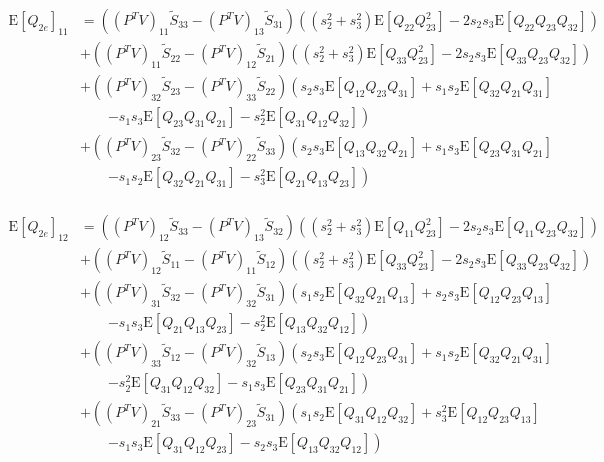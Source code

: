 \documentclass[10pt]{article}
\newcommand{\expect}[1]{\ensuremath{\mathrm{E}\left[ #1 \right]}}
\begin{document}
\begin{align}
	\expect{Q_{2e}}_{11} &= \left( (P^TV)_{11}\tilde{S}_{33} - (P^TV)_{13}\tilde{S}_{31} \right)\left( (s_2^2+s_3^2)\expect{Q_{22}Q_{23}^2} - 2s_2s_3 \expect{Q_{22}Q_{23}Q_{32}} \right) \nonumber \\
	&+ \left( (P^TV)_{11}\tilde{S}_{22} - (P^TV)_{12}\tilde{S}_{21} \right)\left( (s_2^2+s_3^2)\expect{Q_{33}Q_{23}^2} - 2s_2s_3 \expect{Q_{33}Q_{23}Q_{32}} \right) \nonumber \\
	&+ \left( (P^TV)_{32}\tilde{S}_{23} - (P^TV)_{33}\tilde{S}_{22} \right)\left( s_2s_3\expect{Q_{12}Q_{23}Q_{31}} + s_1s_2\expect{Q_{32}Q_{21}Q_{31}} \right. \nonumber \\ &\qquad \left. - s_1s_3\expect{Q_{23}Q_{31}Q_{21}} - s_2^2\expect{Q_{31}Q_{12}Q_{32}} \right) \nonumber \\
	&+ \left( (P^TV)_{23}\tilde{S}_{32} - (P^TV)_{22}\tilde{S}_{33} \right)\left( s_2s_3\expect{Q_{13}Q_{32}Q_{21}} + s_1s_3\expect{Q_{23}Q_{31}Q_{21}} \right. \nonumber \\ &\qquad \left. - s_1s_2\expect{Q_{32}Q_{21}Q_{31}} - s_3^2\expect{Q_{21}Q_{13}Q_{23}} \right) \nonumber \\
\end{align}

\begin{align}
	\expect{Q_{2e}}_{12} &= \left( (P^TV)_{12}\tilde{S}_{33} - (P^TV)_{13}\tilde{S}_{32} \right)\left( (s_2^2+s_3^2)\expect{Q_{11}Q_{23}^2} - 2s_2s_3\expect{Q_{11}Q_{23}Q_{32}} \right) \nonumber \\
	&+ \left( (P^TV)_{12}\tilde{S}_{11} - (P^TV)_{11}\tilde{S}_{12} \right)\left( (s_2^2+s_3^2)\expect{Q_{33}Q_{23}^2} - 2s_2s_3\expect{Q_{33}Q_{23}Q_{32}} \right) \nonumber \\
	&+ \left( (P^TV)_{31}\tilde{S}_{32} - (P^TV)_{32}\tilde{S}_{31} \right)\left( s_1s_2\expect{Q_{32}Q_{21}Q_{13}} + s_2s_3\expect{Q_{12}Q_{23}Q_{13}} \right. \nonumber \\ &\qquad \left. - s_1s_3\expect{Q_{21}Q_{13}Q_{23}} - s_2^2\expect{Q_{13}Q_{32}Q_{12}} \right) \nonumber \\
	&+ \left( (P^TV)_{33}\tilde{S}_{12} - (P^TV)_{32}\tilde{S}_{13} \right)\left( s_2s_3\expect{Q_{12}Q_{23}Q_{31}} + s_1s_2\expect{Q_{32}Q_{21}Q_{31}} \right. \nonumber \\ &\qquad \left. - s_2^2\expect{Q_{31}Q_{12}Q_{32}} - s_1s_3\expect{Q_{23}Q_{31}Q_{21}} \right) \nonumber \\
	&+ \left( (P^TV)_{21}\tilde{S}_{33} - (P^TV)_{23}\tilde{S}_{31} \right)\left( s_1s_2\expect{Q_{31}Q_{12}Q_{32}} + s_3^2\expect{Q_{12}Q_{23}Q_{13}} \right. \nonumber \\ &\qquad \left. - s_1s_3\expect{Q_{31}Q_{12}Q_{23}} - s_2s_3\expect{Q_{13}Q_{32}Q_{12}} \right)
\end{align}
\end{document}
